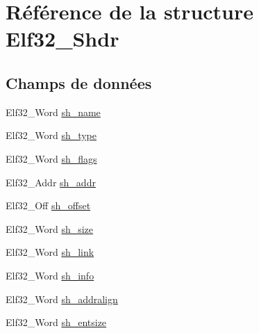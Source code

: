 \hypertarget{structElf32__Shdr}{\section{Référence de la structure Elf32\-\_\-\-Shdr}
\label{structElf32__Shdr}
}
\subsection*{Champs de données}
\begin{DoxyCompactItemize}
\item 
Elf32\-\_\-\-Word \hyperlink{structElf32__Shdr_a6e8fd300ca473a31d0f65817ce371dfd}{sh\-\_\-name}
\item 
Elf32\-\_\-\-Word \hyperlink{structElf32__Shdr_aab6c221dbd7e16987df41280fb915408}{sh\-\_\-type}
\item 
Elf32\-\_\-\-Word \hyperlink{structElf32__Shdr_a27e003d8da37de3038a0065577a7743d}{sh\-\_\-flags}
\item 
Elf32\-\_\-\-Addr \hyperlink{structElf32__Shdr_a7e668a62cee74a2f9c6edabb5f45635a}{sh\-\_\-addr}
\item 
Elf32\-\_\-\-Off \hyperlink{structElf32__Shdr_a6e37227a5777cddc0a9dbbb3c2598ec1}{sh\-\_\-offset}
\item 
Elf32\-\_\-\-Word \hyperlink{structElf32__Shdr_a84dc67bb0ab65880bbcd74fbee722ff1}{sh\-\_\-size}
\item 
Elf32\-\_\-\-Word \hyperlink{structElf32__Shdr_ad759308388eb14c5c6e4d636c38999da}{sh\-\_\-link}
\item 
Elf32\-\_\-\-Word \hyperlink{structElf32__Shdr_aef63fe62c2c9927f374c4f987954c6e5}{sh\-\_\-info}
\item 
Elf32\-\_\-\-Word \hyperlink{structElf32__Shdr_a399f50b3591e6286d4ad819f790979ed}{sh\-\_\-addralign}
\item 
Elf32\-\_\-\-Word \hyperlink{structElf32__Shdr_a10c59cecc928aae27930601fe545d3ca}{sh\-\_\-entsize}
\end{DoxyCompactItemize}


